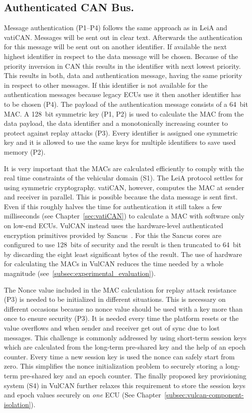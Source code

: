 \subsection{Authenticated CAN Bus. }

Message authentication (P1--P4) follows the same approach as in LeiA and vatiCAN\@. Messages will be sent out in clear text. Afterwards the authentication for this message will be sent out on another identifier. If available the next highest identifier in respect to the data message will be chosen. Because of the priority inversion in CAN this results in the identifier with next lowest priority. This results in both, data and authentication message, having the same priority in respect to other messages. If this identifier is not available for the authentication messages because legacy ECUs use it then another identifier has to be chosen (P4). The payload of the authentication message consists of a 64~bit MAC\@. A 128~bit symmetric key (P1, P2) is used to calculate the MAC from the data payload, the data identifier and a monotonically increasing counter to protect against replay attacks (P3). Every identifier is assigned one symmetric key and it is allowed to use the same keys for multiple identifiers to save used memory (P2).

It is very important that the MACs are calculated efficiently to comply with the
real time constraints of the vehicular domain (S1). The LeiA protocol settles
for using symmetric cryptography\@. vatiCAN, however, computes the MAC at sender
and receiver in parallel. This is possible because the data message is sent
first. Even if this roughly halves the time for authentication it still takes a
few milliseconds (see Chapter~\ref{sec:vatiCAN}) to calculate a MAC with
software only on low-end ECUs. VulCAN instead uses the hardware-level
authenticated encryption primitives provided by Sancus~\cite{Noorman}. For this
the Sancus cores are configured to use 128~bits of security and the result is
then truncated to 64~bit by discarding the eight least significant bytes of the
result. The use of hardware for calculating the MACs in VulCAN reduces the time
needed by a whole magnitude (see~\ref{subsec:experimental_evaluation}).

The Nonce value included in the MAC calculation for replay attack resistance
(P3) is needed to be initialized in different situations. This is necessary on
different occasions because no nonce value should be used with a key more than
once to ensure security (P3). It is needed every time the platform resets or the
value overflows and when sender and receiver get out of sync due to lost
messages. This challenge is commonly addressed by using short-term session keys
which are calculated from the long-term pre-shared key and the help of an epoch
counter. Every time a new session key is used the nonce can safely start from
zero. This simplifies the nonce initialization problem to securely storing a
long-term pre-shared key and an epoch counter. The finally proposed key provisioning system (S4) in VulCAN further relaxes this requirement to store the session keys and epoch values securely on \textit{one} ECU (See Chapter~\ref{subsec:vulcan-component-isolation}).

